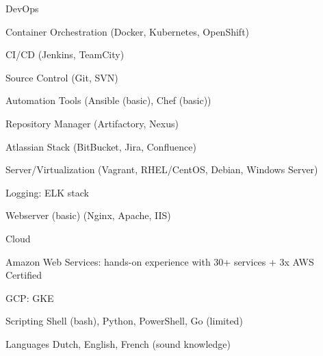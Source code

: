 

\begin{cvskills}

  \cvskill
    {DevOps} %
    {
      \begin{cvitems} %
        \item {Container Orchestration (Docker, Kubernetes, OpenShift)}
        \item {CI/CD (Jenkins, TeamCity)}
        \item {Source Control (Git, SVN)}
        \item {Automation Tools (Ansible (basic), Chef (basic))}
        \item {Repository Manager (Artifactory, Nexus)}
        \item {Atlassian Stack (BitBucket, Jira, Confluence)}
        \item {Server/Virtualization (Vagrant, RHEL/CentOS, Debian, Windows Server)}
        \item {Logging: ELK stack}
        \item {Webserver (basic) (Nginx, Apache, IIS)}
      \end{cvitems}
    }


  \cvskill
    {Cloud} %
    {
      \begin{cvitems} %
        \item {Amazon Web Services: hands-on experience with 30+ services + 3x AWS Certified}
        \item {GCP: GKE}
      \end{cvitems}
    }

  \cvskill
    {Scripting} %
    {Shell (bash), Python, PowerShell, Go (limited)} %

  \cvskill
    {Languages} %
    {Dutch, English, French (sound knowledge)} %

\end{cvskills}
